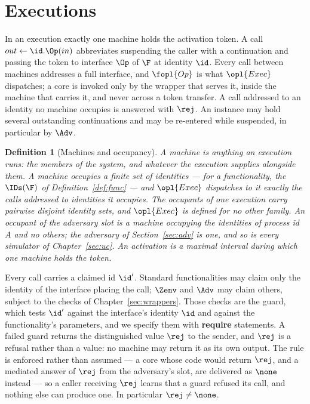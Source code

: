 \documentclass[10pt,oneside,openany]{book}
\theoremstyle{accentdef}
\newtheorem{definition}{Definition}[chapter]
\theoremstyle{accentplain}
\begin{document}
\section{Executions}\label{sec:execution}

In an execution exactly one machine holds the activation token. A call $out \gets \id.\Op(in)$
abbreviates suspending the caller with a continuation and passing the token to interface $\Op$ of
$\F$ at identity $\id$. Every call between machines addresses a full interface, and
$\fopl{Op}$ is what $\opl{Exec}$ dispatches; a core is invoked only by the wrapper that serves
it, inside the machine that carries it, and never across a token transfer. A call addressed to an
identity no machine occupies is answered with $\rej$. An instance may hold several outstanding
continuations and may be re-entered while suspended, in particular by $\Adv$.

\begin{definition}[Machines and occupancy]\label{def:occ}
A \emph{machine} is anything an execution runs: the members of
the system, and whatever the execution supplies alongside them. A machine \emph{occupies} a
finite set of identities --- for a functionality, the $\IDs(\F)$ of Definition~\ref{def:func} ---
and $\opl{Exec}$ dispatches to it exactly the calls addressed to identities it occupies. The
occupants of one execution carry pairwise disjoint identity sets, and $\opl{Exec}$ is defined for
no other family. An \emph{occupant of the adversary slot} is a machine occupying the identities
of process id $A$ and no others; the adversary of Section~\ref{sec:adv} is one, and so is every
simulator of Chapter~\ref{sec:uc}. An \emph{activation} is a maximal interval during which one
machine holds the token.
\end{definition}

Every call carries a claimed id $\id'$. Standard functionalities may claim only the identity of
the interface placing the call; $\Zenv$ and $\Adv$ may claim others, subject to the checks of
Chapter~\ref{sec:wrappers}. Those checks are the guard, which tests $\id'$ against the
interface's identity $\id$ and against the functionality's parameters, and we specify them with
\textbf{require} statements. A failed guard returns the distinguished value $\rej$ to the sender,
and $\rej$ is a refusal rather than a value: no machine may return it as its own output. The rule
is enforced rather than assumed --- a core whose code would return $\rej$, and a mediated answer
of $\rej$ from the adversary's slot, are delivered as $\none$ instead --- so a caller receiving
$\rej$ learns that a guard refused its call, and nothing else can produce one. In particular
$\rej \neq \none$.
\end{document}
